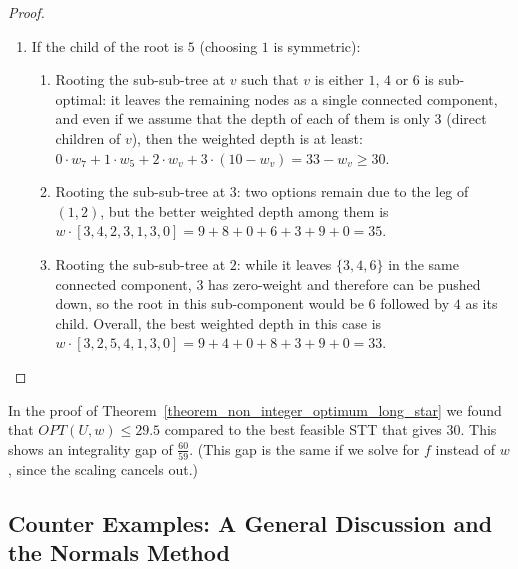 \begin{proof}
\begin{enumerate}
\begin{enumerate}
        \item If the child of the root is $5$ (choosing $1$ is symmetric):
        \begin{enumerate}
            \item Rooting the sub-sub-tree at $v$ such that $v$ is either $1$, $4$ or $6$ is sub-optimal: it leaves the remaining nodes as a single connected component, and even if we assume that the depth of each of them is only $3$ (direct children of $v$), then the weighted depth is at least: $0 \cdot w_7 + 1 \cdot w_5 + 2 \cdot w_v + 3 \cdot (10 - w_v) = 33 - w_v \ge 30$.

            \item Rooting the sub-sub-tree at $3$: two options remain due to the leg of $(1,2)$, but the better weighted depth among them is $w \cdot [3,4,2,3,1,3,0] = 9+8+0 + 6+3 + 9+0 = 35$.

            \item Rooting the sub-sub-tree at $2$: while it leaves $\{3,4,6\}$ in the same connected component, $3$ has zero-weight and therefore can be pushed down, so the root in this sub-component would be $6$ followed by $4$ as its child. Overall, the best weighted depth in this case is $w \cdot [3,2,5,4,1,3,0] = 9+4+0 + 8+3 + 9 +0= 33$. \qedhere
            
        \end{enumerate}
    \end{enumerate}
\end{enumerate}
\end{proof}


\begin{remark}
\label{remark_integrality_gap_example_60over59}
In the proof of Theorem~\ref{theorem_non_integer_optimum_long_star} we found that $OPT(U,w) \le 29.5$ compared to the best feasible STT that gives $30$. This shows an integrality gap of $\frac{60}{59}$. (This gap is the same if we solve for $f$ instead of $w$, since the scaling cancels out.)
\end{remark}
    





\subsection{Counter Examples: A General Discussion and the Normals Method}
\label{subsection_general_counter_exaple}


